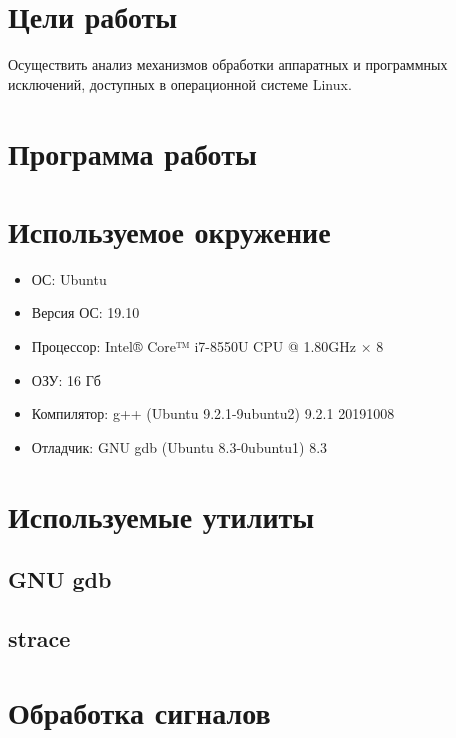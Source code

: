 





\tableofcontents
\newpage

\section{Цели работы}

Осуществить анализ механизмов обработки аппаратных и программных исключений, доступных в операционной системе Linux.

\section{Программа работы}



\section{Используемое окружение}

\begin{itemize}
	\item ОС: Ubuntu
	\item Версия ОС: 19.10
	\item Процессор: Intel® Core™ i7-8550U CPU @ 1.80GHz × 8
	\item ОЗУ: 16 Гб
	\item Компилятор: g++ (Ubuntu 9.2.1-9ubuntu2) 9.2.1 20191008
	\item Отладчик: GNU gdb (Ubuntu 8.3-0ubuntu1) 8.3
\end{itemize}

\section{Используемые утилиты}

\subsection{GNU gdb}


\subsection{strace}


\section{Обработка сигналов}

